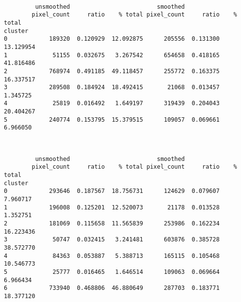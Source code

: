 \documentclass[11pt]{article}
\begin{document}
    
    \begin{center}
    \end{center}
    { \hspace*{\fill} \\}
    
    
    \begin{verbatim}
         unsmoothed                         smoothed                     
        pixel_count     ratio    % total pixel_count     ratio    % total
cluster                                                                  
0            189320  0.120929  12.092875      205556  0.131300  13.129954
1             51155  0.032675   3.267542      654658  0.418165  41.816486
2            768974  0.491185  49.118457      255772  0.163375  16.337517
3            289508  0.184924  18.492415       21068  0.013457   1.345725
4             25819  0.016492   1.649197      319439  0.204043  20.404267
5            240774  0.153795  15.379515      109057  0.069661   6.966050
    \end{verbatim}

    
    \begin{center}
    \end{center}
    { \hspace*{\fill} \\}
    
    
    \begin{verbatim}
         unsmoothed                         smoothed                     
        pixel_count     ratio    % total pixel_count     ratio    % total
cluster                                                                  
0            293646  0.187567  18.756731      124629  0.079607   7.960717
1            196008  0.125201  12.520073       21178  0.013528   1.352751
2            181069  0.115658  11.565839      253986  0.162234  16.223436
3             50747  0.032415   3.241481      603876  0.385728  38.572770
4             84363  0.053887   5.388713      165115  0.105468  10.546773
5             25777  0.016465   1.646514      109063  0.069664   6.966434
6            733940  0.468806  46.880649      287703  0.183771  18.377120
    \end{verbatim}

    
    \begin{center}
    \end{center}
    { \hspace*{\fill} \\}
    
\end{document}
